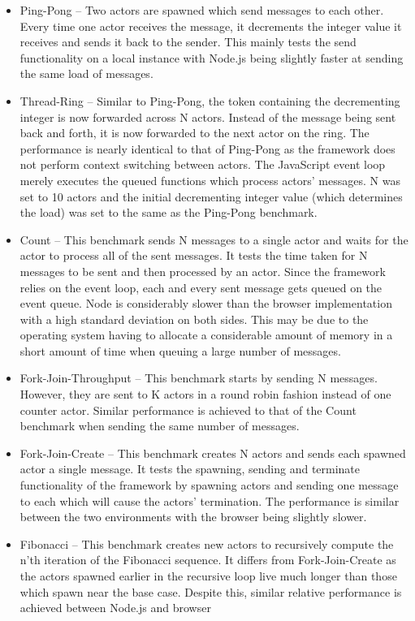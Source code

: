 \documentclass[oneside]{um-fict}
\begin{document}
\begin{itemize}
    \item Ping-Pong – Two actors are spawned which send messages to each other. Every time one actor receives the message, it decrements the integer value it receives and sends it back to the sender. This mainly tests the send functionality on a local instance with Node.js being slightly faster at sending the same load of messages.
    \item Thread-Ring – Similar to Ping-Pong, the token containing the decrementing integer is now forwarded across N actors. Instead of the message being sent back and forth, it is now forwarded to the next actor on the ring. The performance is nearly identical to that of Ping-Pong as the framework does not perform context switching between actors. The JavaScript event loop merely executes the queued functions which process actors' messages. N was set to 10 actors and the initial decrementing integer value (which determines the load) was set to the same as the Ping-Pong benchmark.
    \item Count – This benchmark sends N messages to a single actor and waits for the actor to process all of the sent messages. It tests the time taken for N messages to be sent and then processed by an actor. Since the framework relies on the event loop, each and every sent message gets queued on the event queue. Node is considerably slower than the browser implementation with a high standard deviation on both sides. This may be due to the operating system having to allocate a considerable amount of memory in a short amount of time when queuing a large number of messages.
    \item Fork-Join-Throughput – This benchmark starts by sending N messages. However, they are sent to K actors in a round robin fashion instead of one counter actor. Similar performance is achieved to that of the Count benchmark when sending the same number of messages.
    \item Fork-Join-Create – This benchmark creates N actors and sends each spawned actor a single message. It tests the spawning, sending and terminate functionality of the framework by spawning actors and sending one message to each which will cause the actors' termination. The performance is similar between the two environments with the browser being slightly slower.
    \item Fibonacci – This benchmark creates new actors to recursively compute the n'th iteration of the Fibonacci sequence. It differs from Fork-Join-Create as the actors spawned earlier in the recursive loop live much longer than those which spawn near the base case. Despite this, similar relative performance is achieved between Node.js and browser

\end{itemize}
\end{document}
